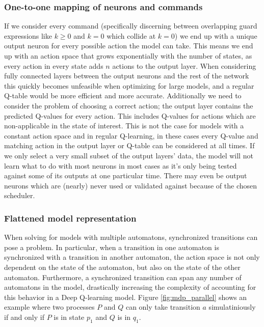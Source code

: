 \subsubsection{One-to-one mapping of neurons and commands}
If we consider every command (specifically discerning between overlapping guard expressions like $k \ge 0$ and $k = 0$ which collide at $k = 0$) we end up with a unique output neuron for every possible action the model can take. This means we end up with an action space that grows exponentially with the number of states, as every action in every state adds $n$ actions to the output layer. When considering fully connected layers between the output neurons and the rest of the network this quickly becomes unfeasible when optimizing for large models, and a regular Q-table would be more efficient and more accurate. Additionally we need to consider the problem of choosing a correct action; the output layer contains the predicted Q-values for every action. This includes Q-values for actions which are non-applicable in the state of interest. This is not the case for models with a constant action space and in regular Q-learning, in these cases every Q-value and matching action in the output layer or Q-table can be considered at all times. If we only select a very small subset of the output layers' data, the model will not learn what to do with most neurons in most cases as it's only being tested against some of its outputs at one particular time. There may even be output neurons which are (nearly) never used or validated against because of the chosen scheduler.

\subsubsection{Flattened model representation}
When solving for models with multiple automatons, synchronized transitions can pose a problem. In particular, when a transition in one automaton is synchronized with a transition in another automaton, the action space is not only dependent on the state of the automaton, but also on the state of the other automaton. Furthermore, a synchronized transition can span any number of automatons in the model, drastically increasing the complexity of accounting for this behavior in a Deep Q-learning model. Figure \ref*{fig:mdp_parallel} shows an example where two processes $P$ and $Q$ can only take transition $a$ simulatiniously if and only if $P$ is in state $p_1$ and $Q$ is in $q_1$.

